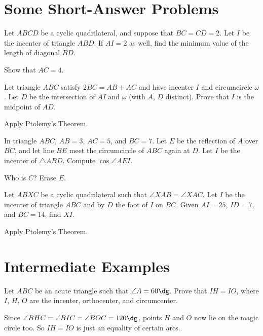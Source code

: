 \documentclass[11pt]{scrartcl}
\begin{document}
\section{Some Short-Answer Problems}
\begin{problem}
  [HMMT 2011] Let $ABCD$ be a cyclic quadrilateral, and suppose that $BC = CD = 2$.
  Let $I$ be the incenter of triangle $ABD$.
  If $AI = 2$ as well, find the minimum value of the length of diagonal $BD$.
  \begin{hint}
    Show that $AC = 4$.
  \end{hint}
\end{problem}
\begin{problem}
  [HMMT 2013] Let triangle $ABC$ satisfy $2BC = AB+AC$ and have incenter $I$ and circumcircle $\omega$.
  Let $D$ be the intersection of $AI$ and $\omega$ (with $A$, $D$ distinct).
  Prove that $I$ is the midpoint of $AD$.
  \begin{hint}
    Apply Ptolemy's Theorem.
  \end{hint}
\end{problem}

\begin{problem}
   In triangle $ABC$, $AB=3$, $AC=5$, and $BC=7$.
  Let $E$ be the reflection of $A$ over $\overline{BC}$, and let line $BE$ meet the circumcircle of $ABC$ again at $D$. Let $I$ be the incenter of $\triangle ABD$.
  Compute $\cos \angle AEI$.
  \begin{hint}
    Who is $C$? Erase $E$.
  \end{hint}
\end{problem}

\begin{problem}
  [NIMO 2012] Let $ABXC$ be a cyclic quadrilateral such that $\angle XAB = \angle XAC$.
  Let $I$ be the incenter of triangle $ABC$
  and by $D$ the foot of $I$ on $\overline{BC}$.
  Given $AI=25$, $ID = 7$, and $BC = 14$, find $XI$.
  \begin{hint}
    Apply Ptolemy's Theorem.
  \end{hint}
\end{problem}

\section{Intermediate Examples}
\begin{problem}
  Let $ABC$ be an acute triangle such that $\angle A = 60\dg$.
  Prove that $IH = IO$, where $I$, $H$, $O$ are the incenter, orthocenter, and circumcenter.
  \begin{hint}
    Since $\angle BHC = \angle BIC = \angle BOC = 120\dg$, points $H$ and $O$ now lie on the magic circle too.
    So $IH = IO$ is just an equality of certain arcs.
  \end{hint}
\end{problem}
\end{document}
